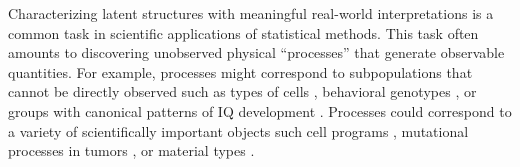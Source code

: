 Characterizing latent structures with meaningful real-world interpretations is a common task in scientific applications of statistical methods.
This task often amounts to discovering unobserved physical ``processes'' that generate observable quantities.
For example, processes might correspond to subpopulations that cannot be directly observed such as
types of cells \citep{Gorsky:2020,Prabhakaran:2016}, behavioral genotypes \citep{Stevens:2019}, or
groups with canonical patterns of IQ development \citep{Bauer:2007}.
Processes could correspond to a variety of scientifically important objects such cell programs \citep{Kotliar_Identify_Cell_Idendity_Activity_NMF_2019,Buettner_FscLVM_ScalableVersatile_FA_2017,Risso_General_Flexible_Signal_Extract_2018},
mutational processes in tumors %
\citep{Levitin_DeNovo_Gene_Signature_Identification_2019,Kinker_Pan_Cancer_2020,Seplyarskiy_PopulationSequencingData_2021},
or material types
\citep{Fevotte_NonlinearHyperspectralUnmixing_2015,Rajabi_SpectralUnmixingHyperspectral_2015}.

